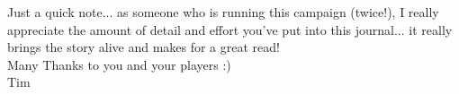 Just a quick note... as someone who is running this campaign (twice!), I really appreciate the amount of detail and effort you've put into this journal... it really brings the story alive and makes for a great read!\\

Many Thanks to you and your players :)\\

Tim\\

